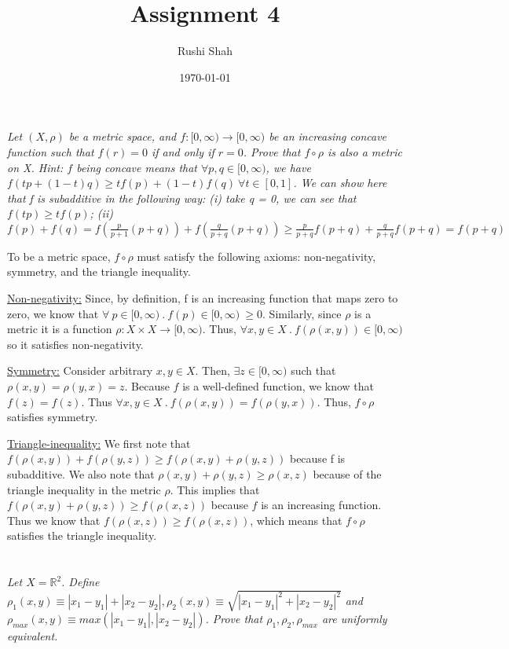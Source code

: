 \documentclass[]{article}
\author{Rushi Shah}
\date{\today}
\title{Assignment 4}
\newcommand{\reals}{\mathbb{R}}
\begin{document}
	\maketitle

	\section{}
		\textit{
		Let $(X, \rho)$ be a metric space, and $f : [0, \infty) \to [0, \infty)$ be an increasing concave function such that $f(r) = 0$ if and only if $r = 0$. 
		Prove that $f \circ \rho$ is also a metric on X. 
		Hint: $f$ being concave means that $\forall p, q \in [0, \infty)$, we have $f(tp + (1 - t)q) \geq tf(p) + (1 - t)f(q)\ \forall t \in [0, 1]$. We can show here that f is subadditive in the following way: (i) take q = 0, we can see that $f(tp) \geq tf(p)$; (ii) $f(p) + f(q) = f(\frac{p}{p + 1}(p + q)) + f(\frac{q}{p + q}(p + q)) \geq \frac{p}{p + q}f(p + q) + \frac{q}{p + q}f(p + q) = f(p + q)$}

		To be a metric space, $f \circ \rho$ must satisfy the following axioms: non-negativity, symmetry, and the triangle inequality. 

		\underline{Non-negativity:} 
			Since, by definition, f is an increasing function that maps zero to zero, we know that $\forall\ p \in [0, \infty)\ .\ f(p) \in [0, \infty)\ \geq 0$. Similarly, since $\rho$ is a metric it is a function $\rho : X \times X \to [0, \infty)$. Thus, $\forall x, y \in X\ .\ f(\rho(x, y)) \in [0, \infty)$ so it satisfies non-negativity. 

		\underline{Symmetry:} 
			Consider arbitrary $x, y \in X$. Then, $\exists z \in [0, \infty)$ such that $\rho(x, y) = \rho(y, x) = z$. Because $f$ is a well-defined function, we know that $f(z) = f(z)$. Thus $\forall x, y \in X\ .\ f(\rho(x, y)) = f(\rho(y, x))$. Thus, $f \circ \rho$ satisfies symmetry. 

		\underline{Triangle-inequality:} 
			We first note that $f(\rho(x, y)) + f(\rho(y, z)) \geq f(\rho(x, y) + \rho(y, z))$ because f is subadditive. We also note that $\rho(x, y) + \rho(y, z) \geq \rho(x, z)$ because of the triangle inequality in the metric $\rho$. This implies that $f(\rho(x, y) + \rho(y, z)) \geq f(\rho(x, z))$ because $f$ is an increasing function. Thus we know that $f(\rho(x, z)) \geq f(\rho(x, z))$, which means that $f \circ \rho$ satisfies the triangle inequality. 

	\section{}
		\textit{Let $X = \reals^2$. Define $
		\rho_1(x, y) 
			\equiv |x_1 - y_1| + |x_2 - y_2|, 
		\rho_2(x, y) 
			\equiv \sqrt{|x_1 - y_1|^2 + |x_2 - y_2|^2}$ and $
		\rho_{max}(x, y) 
			\equiv max(|x_1 - y_1|, |x_2 - y_2|)$. 
		Prove that $\rho_1, \rho_2, \rho_{max}$ are uniformly equivalent.}
\end{document}
